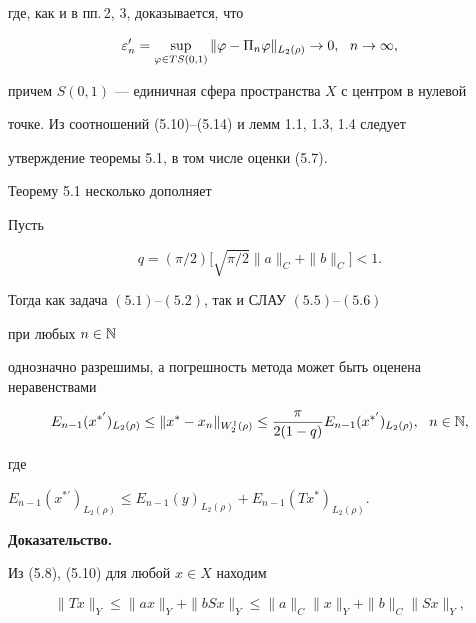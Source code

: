 где, как и в пп.\,2, 3, доказывается, что


\begin{equation}


\ve'_n=


\sup_{\vp\in TS(0,1)}\|\vp-\Pi_n\vp\|_{L_2(\rho)}\to 0,\ \ n\to \infty,


\end{equation}


причем $S(0,1)$ --- единичная сфера пространства $X$ с центром в нулевой


точке. Из соотношений (5.10)--(5.14) и лемм 1.1, 1.3, 1.4 следует


утверждение теоремы 5.1, в том числе оценки (5.7).





Теорему 5.1 несколько дополняет





\begin{thms}


Пусть


\begin{equation}


q=(\pi/2)\big[\sqrt{\pi/2}\|a\|_C+\|b\|_C\big]<1.


\end{equation}


Тогда как задача $(5.1)$--$(5.2)$, так и СЛАУ $(5.5)$--$(5.6)$


при любых $n\in \Bbb N$


однозначно разрешимы, а погрешность метода может быть оценена неравенствами


$$


E_{n-1}(x^{*'})_{L_2(\rho)}\le \|x^*-x_n\|_{W_2^1(\rho)}\le


\frac{\pi}{2(1-q)}E_{n-1}(x^{*'})_{L_2(\rho)},\ \ n\in \Bbb N,


$$


где


$E_{n-1}(x^{*'})_{L_2(\rho)}\le E_{n-1}(y)_{L_2(\rho)}+


E_{n-1}(Tx^*)_{L_2(\rho)}$.


\end{thms}





{\bf Доказательство.}


Из (5.8), (5.10) для любой $x \in X$ находим


\begin{equation}


\|Tx\|_Y \le \|ax\|_Y+ \|bSx\|_Y \le


\|a\|_C \|x\|_Y+\|b\|_C \|Sx\|_Y,


\end{equation}


